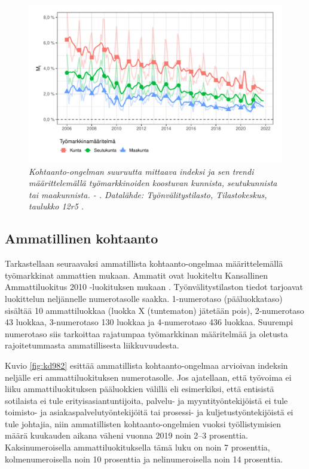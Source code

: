 \documentclass[12pt]{article}
\newcommand{\lastdatamonth}{\unskip}
\newcommand{\firstdatamonth}{\unskip}
\newcommand{\newcaption}[1]{\caption{\textit{\footnotesize{#1}}}}
\begin{document}
\begin{figure}
\centering
\includegraphics[scale = 0.8]{../kuviot/indeksi_alueittain.pdf}
    \newcaption{Kohtaanto-ongelman suuruutta mittaava indeksi ja sen trendi määrittelemällä työmarkkinoiden koostuvan kunnista, seutukunnista tai maakunnista.  \protect \firstdatamonth \phantom{} - \protect\lastdatamonth. Datalähde: Työnvälitystilasto, Tilastokeskus, taulukko 12r5 \protect \cite{svt2011}.}
   \label{fig:kdieksl}
\end{figure}

\subsection{Ammatillinen kohtaanto} \label{section:ammatillinen_kohtaanto}

Tarkastellaan seuraavaksi ammatillista kohtaanto-ongelmaa määrittelemällä työmarkkinat ammattien mukaan. Ammatit ovat luokiteltu Kansallinen Ammattiluokitus 2010 -luokituksen mukaan \cite{tilastokeskus2011ammattiluokitus}. Työnvälitystilaston tiedot tarjoavat luokittelun neljännelle numerotasolle saakka. 1-numerotaso (pääluokkataso) sisältää 10 ammattiluokkaa (luokka X (tuntematon) jätetään pois), 2-numerotaso 43 luokkaa, 3-numerotaso 130 luokkaa ja 4-numerotaso 436 luokkaa. Suurempi numerotaso siis tarkoittaa rajatumpaa työmarkkinan määritelmää ja oletusta rajoitetummasta ammatillisesta liikkuvuudesta. 

Kuvio \ref{fig:kd982} esittää ammatillista kohtaanto-ongelmaa arvioivan indeksin neljälle eri ammattiluokituksen numerotasolle. Jos ajatellaan, että työvoima ei liiku ammattiluokituksen pääluokkien välillä eli esimerkiksi, että entisistä sotilaista ei tule erityisasiantuntijoita, palvelu- ja myyntityöntekijöistä ei tule toimisto- ja asiakaspalvelutyöntekijöitä tai prosessi- ja kuljetustyöntekijöistä ei tule johtajia, niin ammatillisten kohtaanto-ongelmien vuoksi työllistymisien määrä kuukauden aikana väheni vuonna 2019 noin 2–3 prosenttia. Kaksinumeroisella ammattiluokituksella tämä luku on noin 7 prosenttia, kolmenumeroisella noin 10 prosenttia ja nelinumeroisella noin 14 prosenttia.
\end{document}
